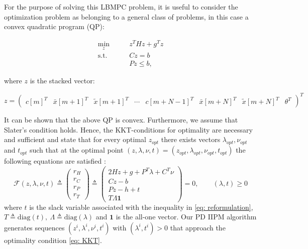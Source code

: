 \documentclass[letter]{article}
\begin{document}
\begin{sffamily}
\noindent
For the purpose of solving this LBMPC problem, it is useful to consider the optimization problem as belonging to a general class of problems, in this case a convex quadratic program (QP):

\begin{align}\label{eq: reformulation}
	 \min_{z} \qquad & z^T H z + g^T z  \\
	  \text{s.t.} \qquad & C z = b \nonumber \\
	 & P z \leq b, \nonumber 
\end{align}

\noindent
where $z$ is the stacked vector:

\begin{equation*}
	z = \begin{pmatrix}	
		c[m]^T & \bar{x}[m+1]^T & \tilde{x}[m+1]^T & \cdots & c[m+N-1]^T & \bar{x}[m+N]^T & \tilde{x}[m+N]^T & \theta^T	\end{pmatrix}^T
\end{equation*}

\noindent
It can be shown that the above QP is convex. Furthermore, we assume that Slater's condition \citep[Ch. 2]{Borrelli2011Book} holds. Hence, the KKT-conditions for optimality are necessary and sufficient and state that for every optimal $z_{opt}$ there exists vectors $\lambda_{opt}, \nu_{opt}$ and $t_{opt}$ such that at the optimal point $(z,\lambda,\nu,t)=(z_{opt},\lambda_{opt},\nu_{opt},t_{opt})$ the following equations are satisfied \citep{Nocedal2000NumOpt}:
\begin{equation}
\label{eq: KKT}
	\mathcal{F}(z,\lambda,\nu,t) \triangleq 
	\begin{pmatrix}
		r_H \\ r_C \\ r_P \\ r_T
	\end{pmatrix} \triangleq
	\begin{pmatrix}
		2Hz + g + P^T \lambda + C^T \nu \\
		Cz - b \\
		Pz-h+t \\
		T\Lambda\mathbf{1}
	\end{pmatrix} = 0,\qquad (\lambda, t) \geq 0
\end{equation}
where $t$ is the slack variable associated with the inequality in \eqref{eq: reformulation}, $T\triangleq\text{diag}(t),\ \Lambda\triangleq\text{diag}(\lambda)$ and $\mathbf{1}$ is the all-one vector. Our PD IIPM algorithm generates sequences $(z^i,\lambda^i,\nu^i,t^i)$ with $(\lambda^i,t^i)>0$ that approach the optimality condition \eqref{eq: KKT}. \\


\end{sffamily}
\end{document}
